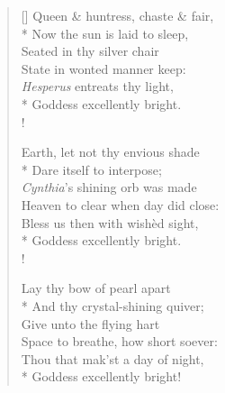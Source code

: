 \documentclass[MAIN]{subfiles}
\begin{document}
\settowidth{\versewidth}{Queen \& huntress, chaste \& fair,}
\begin{verse}[\versewidth]
Queen \& huntress, chaste \& fair,\\*
\vin Now the sun is laid to sleep,\\
Seated in thy silver chair\\
\vin State in wonted manner keep:\\
\vin \vin \emph{Hesperus} entreats thy light,\\*
\vin \vin Goddess excellently bright.\\!

Earth, let not thy envious shade\\*
\vin Dare itself to interpose;\\
\emph{Cynthia}'s shining orb was made\\
\vin Heaven to clear when day did close:\\
\vin \vin Bless us then with wish\`ed sight,\\*
\vin \vin Goddess excellently bright.\\!

Lay thy bow of pearl apart\\*
\vin And thy crystal-shining quiver;\\
Give unto the flying hart\\
\vin Space to breathe, how short soever:\\
\vin \vin Thou that mak'st a day of night,\\*
\vin \vin Goddess excellently bright!
\end{verse}
\end{document}
